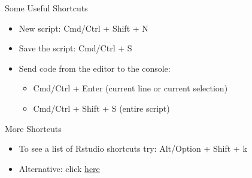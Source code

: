 \documentclass[ignorenonframetext,]{beamer}
\providecommand{\tightlist}{%
  \setlength{\itemsep}{0pt}\setlength{\parskip}{0pt}}
\begin{document}
\begin{frame}{Some Useful Shortcuts}
\protect\hypertarget{some-useful-shortcuts}{}

\begin{itemize}
\item
  New script: Cmd/Ctrl + Shift + N
\item
  Save the script: Cmd/Ctrl + S
\item
  Send code from the editor to the console:

  \begin{itemize}
  \tightlist
  \item
    Cmd/Ctrl + Enter (current line or current selection)
  \item
    Cmd/Ctrl + Shift + S (entire script)
  \end{itemize}
\end{itemize}

\end{frame}

\begin{frame}{More Shortcuts}
\protect\hypertarget{more-shortcuts}{}

\begin{itemize}
\item
  To see a list of Rstudio shortcuts try: Alt/Option + Shift + k
\item
  Alternative: click
  \href{https://support.rstudio.com/hc/en-us/articles/200711853-Keyboard-Shortcuts}{here}
\end{itemize}

\end{frame}
\end{document}
